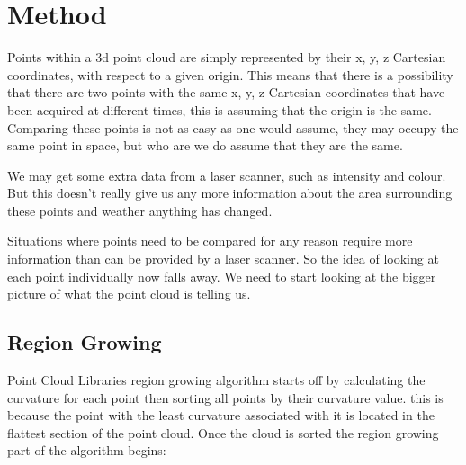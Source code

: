 \chapter{Method}


	
	
	
	Points within a 3d point cloud are simply represented by their x, y, z Cartesian coordinates, with respect to a given origin. This means that there is a possibility that there are two points with the same x, y, z Cartesian coordinates that have been acquired at different times, this is assuming that the origin is the same. Comparing these points is not as easy as one would assume, they may occupy the same point in space, but who are we do assume that they are the same.
	
	We may get some extra data from a laser scanner, such as intensity and colour. But this doesn't really give us any more information about the area surrounding these points and weather anything has changed.
	
	Situations where points need to be compared for any reason require more information than can be provided by a laser scanner. So the idea of looking at each point individually now falls away. We need to start looking at the bigger picture of what the point cloud is telling us.
	

	

	
	
	\section{Region Growing}
	Point Cloud Libraries region growing algorithm starts off by calculating the curvature for each point then sorting all points by their curvature value. this is because the point with the least curvature associated with it is located in the flattest section of the point cloud. Once the cloud is sorted the region growing part of the algorithm begins:
	
